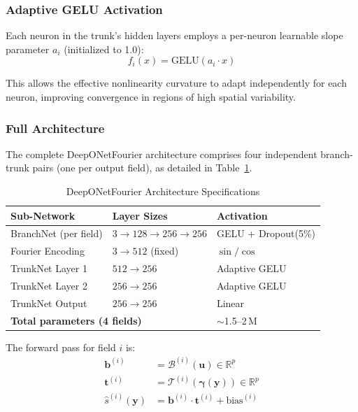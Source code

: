 \documentclass[conference]{IEEEtran}
\begin{document}
\subsubsection{Adaptive GELU Activation}
Each neuron in the trunk's hidden layers employs a per-neuron learnable slope parameter $a_i$ (initialized to 1.0):
\begin{equation}
f_i(x) = \text{GELU}(a_i \cdot x)
\label{eq:adaptive_gelu}
\end{equation}

This allows the effective nonlinearity curvature to adapt independently for each neuron, improving convergence in regions of high spatial variability.

\subsubsection{Full Architecture}
The complete DeepONetFourier architecture comprises four independent branch-trunk pairs (one per output field), as detailed in Table~\ref{tab:arch}.

\begin{table}[htbp]
\caption{DeepONetFourier Architecture Specifications}
\label{tab:arch}
\centering
\begin{tabular}{lll}
\toprule
\textbf{Sub-Network} & \textbf{Layer Sizes} & \textbf{Activation} \\
\midrule
BranchNet (per field) & $3 \to 128 \to 256 \to 256$ & GELU + Dropout(5\%) \\
Fourier Encoding & $3 \to 512$ (fixed) & $\sin / \cos$ \\
TrunkNet Layer 1 & $512 \to 256$ & Adaptive GELU \\
TrunkNet Layer 2 & $256 \to 256$ & Adaptive GELU \\
TrunkNet Output & $256 \to 256$ & Linear \\
\midrule
\multicolumn{2}{l}{\textbf{Total parameters (4 fields)}} & $\sim$1.5--2\,M \\
\bottomrule
\end{tabular}
\end{table}

The forward pass for field $i$ is:
\begin{align}
\mathbf{b}^{(i)} &= \mathcal{B}^{(i)}(\mathbf{u}) \in \mathbb{R}^p \\
\mathbf{t}^{(i)} &= \mathcal{T}^{(i)}(\boldsymbol{\gamma}(\mathbf{y})) \in \mathbb{R}^p \\
\hat{s}^{(i)}(\mathbf{y}) &= \mathbf{b}^{(i)} \cdot \mathbf{t}^{(i)} + \text{bias}^{(i)}
\end{align}
\end{document}
